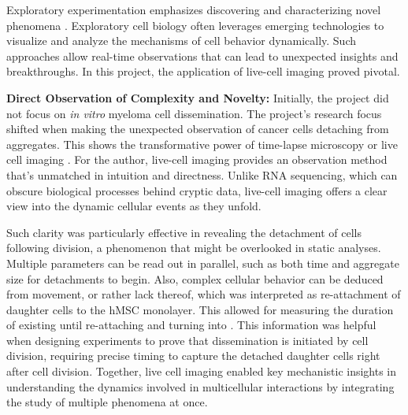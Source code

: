 




% 
%
\label{sec:discussion_potential_breakthroughs}%
Exploratory experimentation emphasizes discovering and characterizing novel
phenomena \cite{mattigClassifyingExploratoryExperimentation2022}. Exploratory
cell biology often leverages emerging technologies to visualize and analyze the
mechanisms of cell behavior dynamically. Such approaches allow real-time
observations that can lead to unexpected insights and breakthroughs. In this
project, the application of live-cell imaging proved pivotal.

\textbf{Direct Observation of Complexity and Novelty:}
Initially, the project did not focus on \textit{in vitro} myeloma cell
dissemination. The project's research focus shifted when making the unexpected
 observation of cancer cells
detaching from aggregates. This shows the transformative power of time-lapse
microscopy or live cell imaging \cite{coleLivecellImaging2014}. For the author,
live-cell imaging provides an observation method that's unmatched in intuition
and directness. Unlike RNA sequencing, which can obscure biological processes
behind cryptic data, live-cell imaging offers a clear view into the dynamic
cellular events as they unfold.

Such clarity was particularly effective in revealing the detachment of cells
following division, a phenomenon that might be overlooked in static analyses.
Multiple parameters can be read out in parallel, such as both time and aggregate
size for detachments to begin. Also, complex cellular behavior can be deduced
from movement, or rather lack thereof, which was interpreted as re-attachment of
\INA daughter cells to the \ac{hMSC} monolayer. This allowed for measuring the
duration of \nMAina existing until re-attaching and turning into \MAina. This
information was helpful when designing experiments to prove that dissemination
is initiated by cell division, requiring precise timing to capture the detached
daughter cells right after cell division. Together, live cell imaging enabled
key mechanistic insights in understanding the dynamics involved in multicellular
interactions by integrating the study of multiple phenomena at once.


